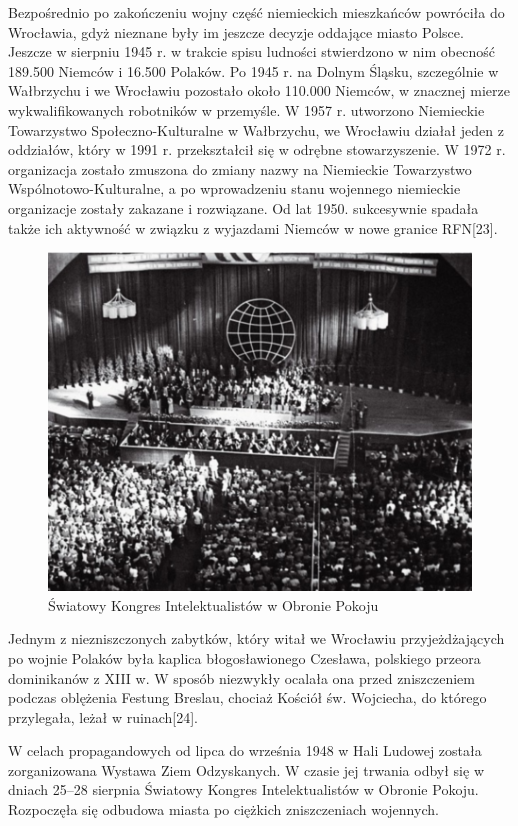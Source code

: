 \documentclass{article}
\begin{document}
Bezpośrednio po zakończeniu wojny część niemieckich mieszkańców powróciła do Wrocławia, gdyż nieznane były im jeszcze decyzje oddające miasto Polsce. Jeszcze w sierpniu 1945 r. w trakcie spisu ludności stwierdzono w nim obecność 189.500 Niemców i 16.500 Polaków. Po 1945 r. na Dolnym Śląsku, szczególnie w Wałbrzychu i we Wrocławiu pozostało około 110.000 Niemców, w znacznej mierze wykwalifikowanych robotników w przemyśle. W 1957 r. utworzono Niemieckie Towarzystwo Społeczno-Kulturalne w Wałbrzychu, we Wrocławiu działał jeden z oddziałów, który w 1991 r. przekształcił się w odrębne stowarzyszenie. W 1972 r. organizacja zostało zmuszona do zmiany nazwy na Niemieckie Towarzystwo Wspólnotowo-Kulturalne, a po wprowadzeniu stanu wojennego niemieckie organizacje zostały zakazane i rozwiązane. Od lat 1950. sukcesywnie spadała także ich aktywność w związku z wyjazdami Niemców w nowe granice RFN[23].
 \begin{figure}[h!]
\centering
\includegraphics[scale=0.4]{17.png}
\caption{Światowy Kongres Intelektualistów w Obronie Pokoju}
\end{figure}

Jednym z niezniszczonych zabytków, który witał we Wrocławiu przyjeżdżających po wojnie Polaków była kaplica błogosławionego Czesława, polskiego przeora dominikanów z XIII w. W sposób niezwykły ocalała ona przed zniszczeniem podczas oblężenia Festung Breslau, chociaż Kościół św. Wojciecha, do którego przylegała, leżał w ruinach[24].

W celach propagandowych od lipca do września 1948 w Hali Ludowej została zorganizowana Wystawa Ziem Odzyskanych. W czasie jej trwania odbył się w dniach 25–28 sierpnia Światowy Kongres Intelektualistów w Obronie Pokoju. Rozpoczęła się odbudowa miasta po ciężkich zniszczeniach wojennych.
\end{document}
